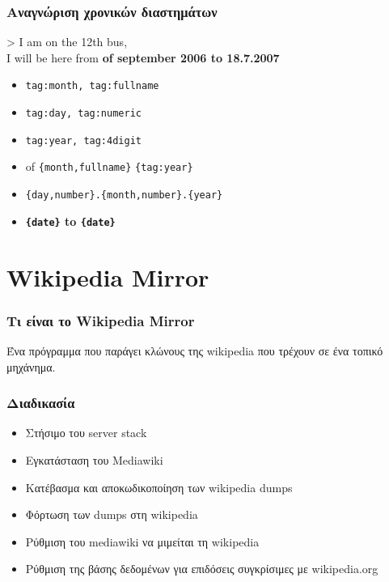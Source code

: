 \documentclass[bigger]{beamer}
\newenvironment{code}{\ttfamily}{\par}
\begin{document}
\begin{frame}
  \frametitle{Αναγνώριση χρονικών διαστημάτων}
  \begin{code}
    > I am on the {12th} bus, \\
    I will be here from \textbf<9>{
      {
        of {september}
        {\color<5-6>{magenta}2006}} to
      {18.7.{2007}}} \\
    \vspace{3.0}
  \end{code}
  \vfill
  \begin{itemize}
  \item<3-> {\color{blue}\texttt{tag:month, tag:fullname}}
  \item<4-> {\color{red}\texttt{tag:day, tag:numeric}}
  \item<5-> {\color{magenta}\texttt{tag:year, tag:4digit}}
  \item<6-> { of
      {\color<6>{blue}\texttt{\{month,fullname\}}}
      {\color<6>{magenta}\texttt{\{tag:year\}}}}
  \item<8-> \texttt{{\color{violet}\{day,number\}.\{month,number\}.\{year\}}}
  \item<9-> \textbf{{\color<9->{violet}\texttt{\{date\}}} to
      {\color<9>{violet}\texttt{\{date\}}}}
  \end{itemize}
\end{frame}

\section{Wikipedia Mirror}

\begin{frame}
  \frametitle{Τι είναι το Wikipedia Mirror}

  Ένα πρόγραμμα που παράγει κλώνους της wikipedia που τρέχουν σε ένα
  τοπικό μηχάνημα.

\end{frame}

\begin{frame}
  \frametitle{Διαδικασία}
  \begin{itemize}
  \item<2-> Στήσιμο του server stack
  \item<3-> Εγκατάσταση του Mediawiki
  \item<4-> Κατέβασμα και αποκωδικοποίηση των wikipedia dumps
  \item<5-> Φόρτωση των dumps στη wikipedia
  \item<6-> Ρύθμιση του mediawiki να μιμείται τη wikipedia
  \item<7-> {\color{gray}Ρύθμιση της βάσης δεδομένων για επιδόσεις
      συγκρίσιμες με wikipedia.org}
  \end{itemize}
\end{frame}
\end{document}
